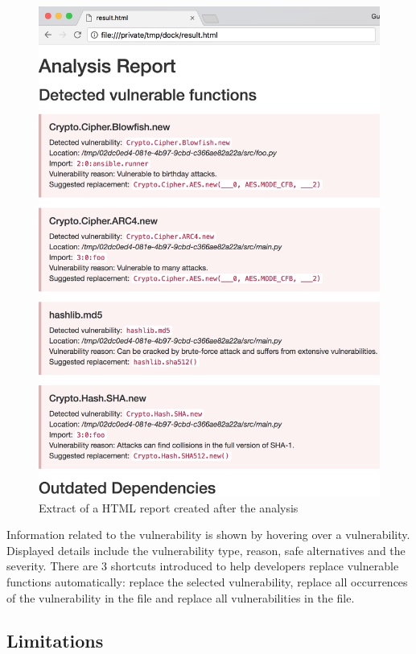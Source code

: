 \begin{figure}[h]
\centering
\includegraphics[width=\linewidth]{"figures/html"}
\caption{Extract of a HTML report created after the analysis}
\label{fig:html}
\end{figure}
Information related to the vulnerability is shown by hovering over a vulnerability. Displayed details include the vulnerability type, reason, safe alternatives and the severity.
There are 3 shortcuts introduced to help developers replace vulnerable functions automatically: replace the selected vulnerability, replace all occurrences of the vulnerability in the file
and replace all vulnerabilities in the file.

\subsection{Limitations}


